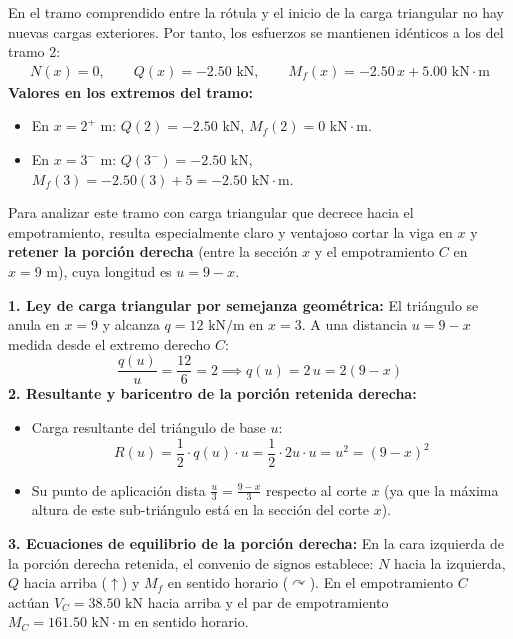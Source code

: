 En el tramo comprendido entre la rótula y el inicio de la carga triangular no hay nuevas cargas exteriores. Por tanto, los esfuerzos se mantienen idénticos a los del tramo 2:
\begin{align*}
    \boxed{N(x) = 0}, \qquad \boxed{Q(x) = -2.50\text{ kN}}, \qquad \boxed{M_f(x) = -2.50\,x + 5.00\text{ kN}\cdot\text{m}}
\end{align*}
\textbf{Valores en los extremos del tramo:}
\begin{itemize}
    \item En $x = 2^+\text{ m}$: $Q(2) = -2.50\text{ kN}$, \quad $M_f(2) = 0\text{ kN}\cdot\text{m}$.
    \item En $x = 3^-\text{ m}$: $Q(3^-) = -2.50\text{ kN}$, \quad $M_f(3) = -2.50(3) + 5 = -2.50\text{ kN}\cdot\text{m}$.
\end{itemize}

Para analizar este tramo con carga triangular que decrece hacia el empotramiento, resulta especialmente claro y ventajoso cortar la viga en $x$ y \textbf{retener la porción derecha} (entre la sección $x$ y el empotramiento $C$ en $x=9\text{ m}$), cuya longitud es $u = 9 - x$.

\textbf{1. Ley de carga triangular por semejanza geométrica:}
El triángulo se anula en $x=9$ y alcanza $q = 12\text{ kN/m}$ en $x=3$. A una distancia $u = 9 - x$ medida desde el extremo derecho $C$:
\[
    \frac{q(u)}{u} = \frac{12}{6} = 2 \implies q(u) = 2\,u = 2(9 - x)
\]
\textbf{2. Resultante y baricentro de la porción retenida derecha:}
\begin{itemize}
    \item Carga resultante del triángulo de base $u$:
    \[
        R(u) = \frac{1}{2} \cdot q(u) \cdot u = \frac{1}{2} \cdot 2u \cdot u = u^2 = (9 - x)^2
    \]
    \item Su punto de aplicación dista $\frac{u}{3} = \frac{9-x}{3}$ respecto al corte $x$ (ya que la máxima altura de este sub-triángulo está en la sección del corte $x$).
\end{itemize}

\textbf{3. Ecuaciones de equilibrio de la porción derecha:}
En la cara izquierda de la porción derecha retenida, el convenio de signos establece: $N$ hacia la izquierda, $Q$ hacia arriba ($\uparrow$) y $M_f$ en sentido horario ($\curvearrowright$). En el empotramiento $C$ actúan $V_C = 38.50\text{ kN}$ hacia arriba y el par de empotramiento $M_C = 161.50\text{ kN}\cdot\text{m}$ en sentido horario.

